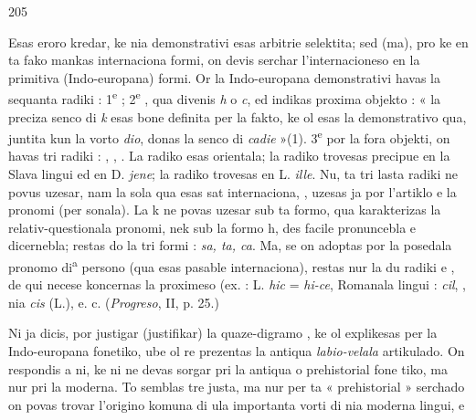 \begin{VUpage}[209]{205}
\VUsaut{1.29mm}
\VUsaut{4.43mm}

Esas eroro kredar, ke nia demonstrativi esas arbitrie\nl
selektita; sed (ma), pro ke en ta fako mankas internaciona\nl
formi, on devis serchar l'internacioneso en la primitiva\nl
(Indo-europana) formi. Or la Indo-europana demonstrativi\nl
havas la sequanta radiki : 1\textsuperscript{e} ; 2\textsuperscript{e} , qua divenis \textit{h} o \textit{c},\nl
ed indikas proxima objekto : « la preciza senco di \textit{k} esas\nl
bone definita per la fakto, ke ol esas la demonstrativo qua,\nl
juntita kun la vorto \textit{dio}, donas la senco di \textit{cadie} »(1). 3\textsuperscript{e} por\nl
la fora objekti, on havas tri radiki : , , . La radiko \nl
esas orientala; la radiko  trovesas precipue en la Slava\nl
lingui ed en D. \textit{jene}; la radiko  trovesas en L. \textit{ille}. Nu, ta\nl
tri lasta radiki ne povus uzesar, nam la sola qua esas sat\nl
internaciona, , uzesas ja por l'artiklo e la pronomi (per\cc
sonala). La k ne povas uzesar sub ta formo, qua karakterizas\nl
la relativ-questionala pronomi, nek sub la formo h, des\cc
facile pronuncebla e dicernebla; restas do la tri formi :\nl
\textit{sa, ta, ca}. Ma, se on adoptas  por la posedala pronomo di\textsuperscript{a} persono (qua esas pasable internaciona), restas nur la\nl
du radiki  e , de qui  necese koncernas la proximeso\nl
(ex. : L. \textit{hic} = \textit{hi-ce}, Romanala lingui : \textit{cil}, , nia \textit{cis}\nl
(L.), e. c. (\textit{Progreso}, II, p. 25.)

\VUblanc{6.28mm}
\VUblanc{2.01mm}

Ni ja dicis, por justigar (justifikar) la quaze-digramo ,\nl
ke ol explikesas per la Indo-europana fonetiko, ube ol re\cc
prezentas la antiqua \textit{labio-velala} artikulado. On respondis a\nl
ni, ke ni ne devas sorgar pri la antiqua o prehistorial fone\cc
tiko, ma nur pri la moderna. To semblas tre justa, ma nur\nl
per ta « prehistorial » serchado on povas trovar l'origino\nl
komuna di ula importanta vorti di nia moderna lingui, e\nl
\end{VUpage}

